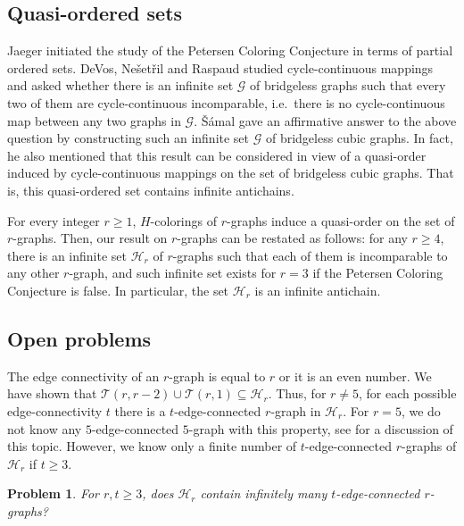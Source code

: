 \documentclass[a4paper,11pt]{article}
\newcommand{\ca}{\mathcal}
\newtheorem{prob}[defi]{Problem}
\theoremstyle{remark}
\begin{document}
\subsection{Quasi-ordered sets}
Jaeger \cite{Jaeger1980} initiated the study of the Petersen Coloring Conjecture in terms of partial ordered sets. DeVos, Ne\v{s}et\v{r}il and Raspaud \cite{DeVos_etal_2007} studied cycle-continuous mappings and asked whether there is an infinite set $ \ca G $ of  bridgeless graphs such that every two of them are cycle-continuous incomparable, i.e.\ there is no cycle-continuous map between any two graphs in $\ca G$.
\v{S}\'amal \cite{Robert_2017} gave an affirmative answer to the above question by constructing such an infinite set $ \ca G $ of  bridgeless cubic graphs.
In fact, he also mentioned that
this result can be considered in view of a quasi-order induced by cycle-continuous mappings on the set of bridgeless cubic graphs. That is, this quasi-ordered set contains infinite antichains.

For every integer $r \geq 1$, $H$-colorings of $r$-graphs induce a quasi-order on the set of $r$-graphs.
Then, our result on $ r $-graphs can be restated  as follows: for any $ r\geq4 $, there is an infinite set $ \ca H_r $ of  $ r $-graphs such that each of them  is  incomparable to any other $ r $-graph, and such infinite set exists for $ r=3 $ if the Petersen Coloring Conjecture is false.  
In particular, the set $\ca H_r $ is an infinite antichain.
 




\subsection{Open problems}

The edge connectivity of an $r$-graph is equal to $r$ or it is an even number.  
We have shown that $\ca T(r,r-2) \cup \ca T(r,1) \subseteq \ca H_r$.
Thus, for $r \not =5$, for each possible edge-connectivity $t$ there is 
a $t$-edge-connected $r$-graph in $\ca H_r$. For $r=5$, we do not know any 
$5$-edge-connected $5$-graph with this property, see \cite{MMSW_pdpm}
for a discussion of this topic. However, we know only a finite 
number of $t$-edge-connected $r$-graphs of $\ca H_r$ if $t \geq 3$. 

\begin{prob}
	For $r,t \geq 3$, does $\ca H_r$ contain infinitely many $t$-edge-connected 
	$r$-graphs?
\end{prob}
\end{document}
